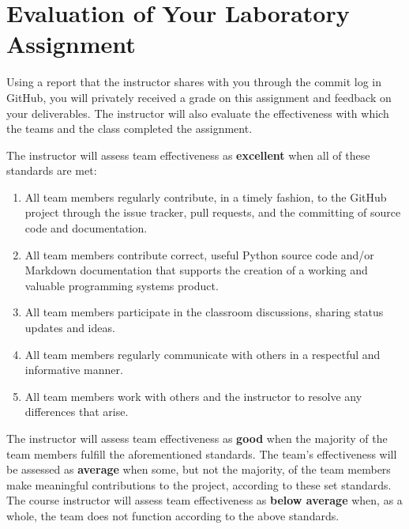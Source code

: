 \documentclass[11pt]{article}
\begin{document}
\vspace*{-1em}

\section*{Evaluation of Your Laboratory Assignment}

Using a report that the instructor shares with you through the commit log in GitHub, you will privately received a grade
on this assignment and feedback on your deliverables. The instructor will also evaluate the effectiveness with which the
teams and the class completed the assignment.

The instructor will assess team effectiveness as {\bf excellent} when all of these standards are met:

\vspace*{-.5em}

\begin{enumerate}
  \setlength{\itemsep}{0pt}

  \item All team members regularly contribute, in a timely fashion, to the GitHub project through the issue tracker,
    pull requests, and the committing of source code and documentation.

  \item All team members contribute correct, useful Python source code and/or Markdown documentation that supports the
    creation of a working and valuable programming systems product.

  \item All team members participate in the classroom discussions, sharing status updates and ideas.

  \item All team members regularly communicate with others in a respectful and informative manner.

  \item All team members work with others and the instructor to resolve any differences that arise.

\end{enumerate}

\vspace*{-.5em}

The instructor will assess team effectiveness as {\bf good} when the majority of the team members fulfill the
aforementioned standards. The team's effectiveness will be assessed as {\bf average} when some, but not the majority, of
the team members make meaningful contributions to the project, according to these set standards. The course instructor
will assess team effectiveness as {\bf below average} when, as a whole, the team does not function according to the
above standards.
\end{document}
